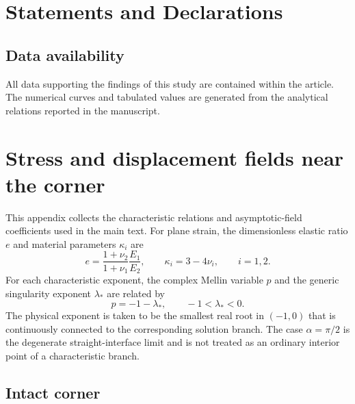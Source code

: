 \documentclass[pdflatex,onecolumn,sn-mathphys-ay]{sn-jnl}
\begin{document}
\section*{Statements and Declarations}
\subsection*{Data availability}
All data supporting the findings of this study are contained within the article.
The numerical curves and tabulated values are generated from the analytical
relations reported in the manuscript.


\appendix
\section{Stress and displacement fields near the corner}
\label{app:asymptotics}
\providecommand{\SingularityExponentFigure}{Figure~\ref{fig:singularity-exponents}}

\setcounter{equation}{0}
\renewcommand{\theequation}{A.\arabic{equation}}

This appendix collects the characteristic relations and asymptotic-field
coefficients used in the main text. For plane strain, the dimensionless
elastic ratio $e$ and material parameters $\kappa_i$ are
\begin{equation*}
  e=\frac{1+\nu_2}{1+\nu_1}\frac{E_1}{E_2},
  \qquad
  \kappa_i=3-4\nu_i,\qquad i=1,2.
\end{equation*}
For each characteristic exponent, the complex Mellin variable $p$ and
the generic singularity exponent $\lambda_*$ are related by
\begin{equation*}
  p=-1-\lambda_*,
  \qquad -1<\lambda_*<0.
\end{equation*}
The physical exponent is taken to be the smallest real root in
$(-1,0)$ that is continuously connected to the corresponding solution
branch. The case $\alpha=\pi/2$ is the degenerate straight-interface
limit and is not treated as an ordinary interior point of a
characteristic branch.

\subsection{Intact corner}
\end{document}
